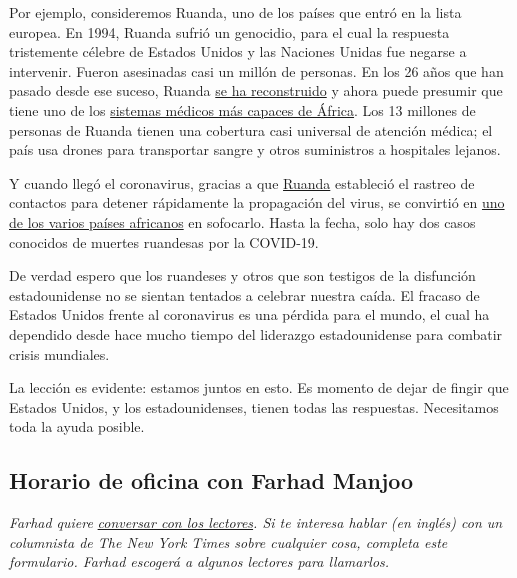 Por ejemplo, consideremos Ruanda, uno de los países que entró en la
lista europea. En 1994, Ruanda sufrió un genocidio, para el cual la
respuesta tristemente célebre de Estados Unidos y las Naciones Unidas
fue negarse a intervenir. Fueron asesinadas casi un millón de personas.
En los 26 años que han pasado desde ese suceso, Ruanda
\href{https://www.nytimes.com/2019/04/06/world/africa/rwanda-genocide-25-years.html}{se
ha reconstruido} y ahora puede presumir que tiene uno de los
\href{https://www.atlanticcouncil.org/blogs/africasource/rwandas-successes-and-challenges-in-response-to-covid-19/}{sistemas
médicos más capaces de África}. Los 13 millones de personas de Ruanda
tienen una cobertura casi universal de atención médica; el país usa
drones para transportar sangre y otros suministros a hospitales lejanos.

Y cuando llegó el coronavirus, gracias a que
\href{https://www.newyorker.com/news/news-desk/what-african-nations-are-teaching-the-west-about-fighting-the-coronavirus}{Ruanda}
estableció el rastreo de contactos para detener rápidamente la
propagación del virus, se convirtió en
\href{https://www.newyorker.com/news/news-desk/what-african-nations-are-teaching-the-west-about-fighting-the-coronavirus}{uno
de los varios países africanos} en sofocarlo. Hasta la fecha, solo hay
dos casos conocidos de muertes ruandesas por la COVID-19.

De verdad espero que los ruandeses y otros que son testigos de la
disfunción estadounidense no se sientan tentados a celebrar nuestra
caída. El fracaso de Estados Unidos frente al coronavirus es una pérdida
para el mundo, el cual ha dependido desde hace mucho tiempo del
liderazgo estadounidense para combatir crisis mundiales.

La lección es evidente: estamos juntos en esto. Es momento de dejar de
fingir que Estados Unidos, y los estadounidenses, tienen todas las
respuestas. Necesitamos toda la ayuda posible.

\hypertarget{horario-de-oficina-con-farhad-manjoo}{%
\subsection{Horario de oficina con Farhad
Manjoo}\label{horario-de-oficina-con-farhad-manjoo}}

\emph{Farhad quiere}
\href{https://www.nytimes.com/2019/05/16/opinion/farhad-office-hours.html?module=inline}{\emph{conversar
con los lectores}}\emph{. Si te interesa hablar (en inglés) con un
columnista de The New York Times sobre cualquier cosa, completa este
formulario. Farhad escogerá a algunos lectores para llamarlos.}

